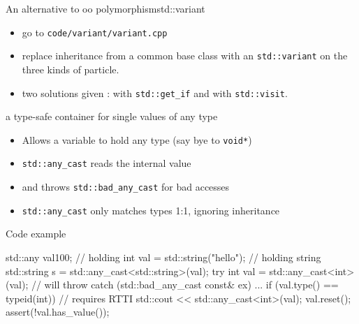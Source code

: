 \begin{frame}[fragile]
  \begin{exerciseWithShortcut}{An alternative to oo polymorphism}{std::variant}
    \begin{itemize}
      \item go to \texttt{code/variant/variant.cpp}
      \item replace inheritance from a common base class with an \texttt{std::variant} on the three kinds of particle.
      \item two solutions given : with \texttt{std::get_if} and with \texttt{std::visit}.
    \end{itemize}
  \end{exerciseWithShortcut}
\end{frame}

\begin{frame}[fragile]
  \begin{block}{a type-safe container for single values of any type}
    \begin{itemize}
    \item Allows a variable to hold any type (say bye to \texttt{void*})
    \item \texttt{std::any_cast} reads the internal value
    \item and throws \texttt{std::bad_any_cast} for bad accesses
    \item \texttt{std::any_cast} only matches types 1:1, ignoring inheritance
    \end{itemize}
  \end{block}
  \begin{exampleblock}{Code example}
    \small
    \begin{cppcode*}{}
      std::any val{100};          // holding int
      val = std::string("hello"); // holding string
      std::string s = std::any_cast<std::string>(val);
      try {
        int val = std::any_cast<int>(val); // will throw
      } catch (std::bad_any_cast const& ex) {...}
      if (val.type() == typeid(int)) // requires RTTI
        std::cout << std::any_cast<int>(val);
      val.reset(); assert(!val.has_value());
    \end{cppcode*}
  \end{exampleblock}
\end{frame}


